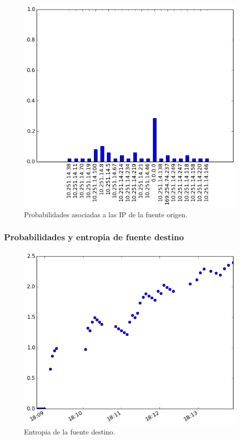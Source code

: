 \begin{figure}[h!]
  \centering
	\includegraphics[scale=0.66]{../experimentacion-svilerino/starbucks/full-experiment-1/histogram_src_probabilities.png}
  \caption{Probabilidades asociadas a las IP de la fuente origen.}
\end{figure}


\subsubsection{Probabilidades y entropia de fuente destino}
\begin{figure}[h!]
  \centering
	\includegraphics[scale=0.66]{../experimentacion-svilerino/starbucks/full-experiment-1/entropy_dst.png}
  \caption{Entropia de la fuente destino.}
\end{figure}

